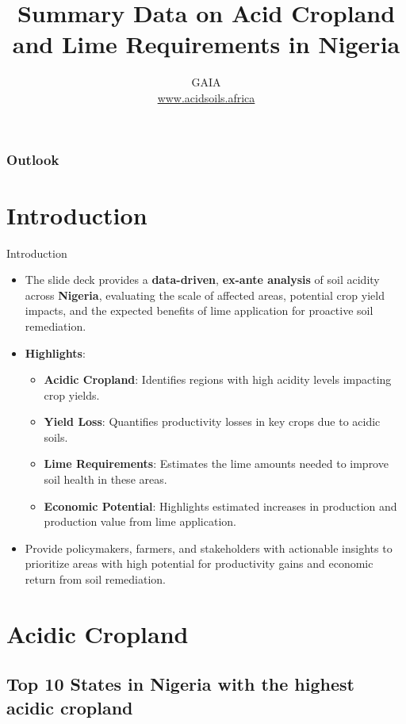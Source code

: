 \documentclass[xcolor=table, aspectratio=1610]{beamer}
\title[Nigeria--Summary]{\textsf{Summary Data on Acid Cropland and Lime Requirements in Nigeria}}
\author[GAIA]{GAIA\\ \href{www.acidsoils.africa}{www.acidsoils.africa} }
\institute[CIMMYT]
\begin{document}
\begin{frame}[plain]
\textsc{\titlepage}
\end{frame}

\begin{frame}
\frametitle{Outlook}
\tableofcontents 
\end{frame}

\section{Introduction}
\begin{frame}{Introduction}
    \begin{itemize}
        \item The slide deck provides a \textbf{data-driven}, \textbf{ex-ante analysis} of soil acidity across \textbf{Nigeria}, evaluating the scale of affected areas, potential crop yield impacts, and the expected benefits of lime application for proactive soil remediation.
        \bigskip
        \item \textbf{Highlights}:
        \begin{itemize}
            \item \textbf{Acidic Cropland}: Identifies regions with high acidity levels impacting crop yields.
            \item \textbf{Yield Loss}: Quantifies productivity losses in key crops due to acidic soils.
            \item \textbf{Lime Requirements}: Estimates the lime amounts needed to improve soil health in these areas.
            \item \textbf{Economic Potential}: Highlights estimated increases in production and production value from lime application.
        \end{itemize}
        \bigskip
        \item Provide policymakers, farmers, and stakeholders with actionable insights to prioritize areas with high potential for productivity gains and economic return from soil remediation.
    \end{itemize}
\end{frame}
\section{Acidic Cropland}
\subsection*{Top 10 States in Nigeria with the highest acidic cropland}
\end{document}
